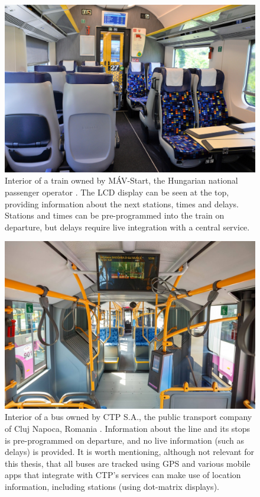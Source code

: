 \begin{figure}[htbp]
    \centering
    \includegraphics[width=\textwidth]{./figures/ch3_mav-interior.png}
    \caption{Interior of a train owned by MÁV-Start, the Hungarian national passenger operator \cite{PestiHirlapMAVInterior}. The LCD display can be seen at the top, providing information about the next stations, times and delays. Stations and times can be pre-programmed into the train on departure, but delays require live integration with a central service.}
    \label{FigMAVInterior}
\end{figure}
\begin{figure}[h]
    \centering
    \includegraphics[width=\textwidth]{./figures/ch3_cluj-troleu-interior.png}
    \caption{Interior of a bus owned by CTP S.A., the public transport company of Cluj Napoca, Romania \cite{ClujuTroleuInterior}. Information about the line and its stops is pre-programmed on departure, and no live information (such as delays) is provided. It is worth mentioning, although not relevant for this thesis, that all buses are tracked using GPS and various mobile apps that integrate with CTP's services can make use of location information, including stations (using dot-matrix displays).}
    \label{FigCTPInterior}
\end{figure}

